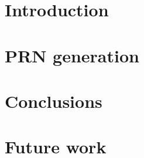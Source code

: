 \documentclass{tfg_domingo}
\begin{document}

\portada
\frontmatter
\gracias{}
\resumen{}{}
\tableofcontents

\mainmatter


\chapter{Introduction}



\chapter{PRN generation}













\chapter{Conclusions}

\chapter{Future work}



\backmatter

\end{document}
